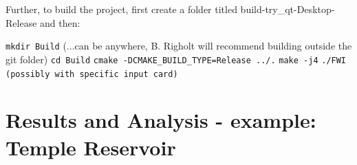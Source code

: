 \documentclass[10pt,a4paper]{article}
\begin{document}
Further, to build the project, first create a folder titled
build-try\_qt-Desktop-Release and then:
\newline

\texttt{mkdir Build} (...can be anywhere, B. Righolt will recommend building outside the git folder)
\newline
\texttt{cd Build}
\newline
\texttt{cmake -DCMAKE\_BUILD\_TYPE=Release ../.}
\newline
\texttt{make -j4}
\newline
\texttt{./FWI (possibly with specific input card)}

\section{Results and Analysis - example: Temple Reservoir}
\end{document}
